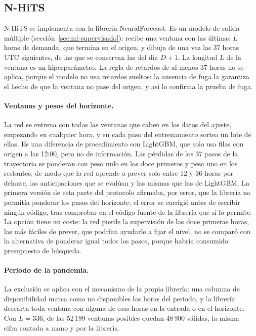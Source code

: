 \subsection{N-HiTS}\label{sec:esp-nhits}

N-HiTS se implementa con la librería NeuralForecast. Es un modelo de salida
múltiple (sección~\ref{sec:ml-supervisado}): recibe una ventana con las
últimas $L$ horas de demanda, que termina en el origen, y dibuja de una vez
las 37 horas UTC siguientes, de las que se conservan las del día $D+1$. La
longitud $L$ de la ventana es un hiperparámetro. La regla de retardos de al
menos 37 horas no se aplica, porque el modelo no usa retardos sueltos: la
ausencia de fuga la garantiza el hecho de que la ventana no pase del origen,
y así lo confirma la prueba de fuga.

\paragraph{Ventanas y pesos del horizonte.} La red se entrena con todas las
ventanas que caben en los datos del ajuste, empezando en cualquier hora, y en
cada paso del entrenamiento sortea un lote de ellas. Es una diferencia de
procedimiento con LightGBM, que solo usa filas con origen a las 12:00, pero
no de información. Las pérdidas de los 37 pasos de la trayectoria se
ponderan con peso nulo en los doce primeros y peso uno en los restantes, de
modo que la red aprende a prever solo entre 12 y 36 horas por delante, las
anticipaciones que se evalúan y las mismas que las de LightGBM. La primera
versión de esta parte del protocolo afirmaba, por error, que la librería no
permitía ponderar los pasos del horizonte; el error se corrigió antes de
escribir ningún código, tras comprobar en el código fuente de la librería
que sí lo permite. La opción tiene un coste: la red pierde la supervisión de
las doce primeras horas, las más fáciles de prever, que podrían ayudarle a
fijar el nivel; no se comparó con la alternativa de ponderar igual todos los
pasos, porque habría consumido presupuesto de búsqueda.

\paragraph{Periodo de la pandemia.} La exclusión se aplica con el mecanismo
de la propia librería: una columna de disponibilidad marca como no
disponibles las horas del periodo, y la librería descarta toda ventana con
alguna de esas horas en la entrada o en el horizonte. Con $L = 336$, de las
52\,199 ventanas posibles quedan 48\,900 válidas, la misma cifra contada a
mano y por la librería.

